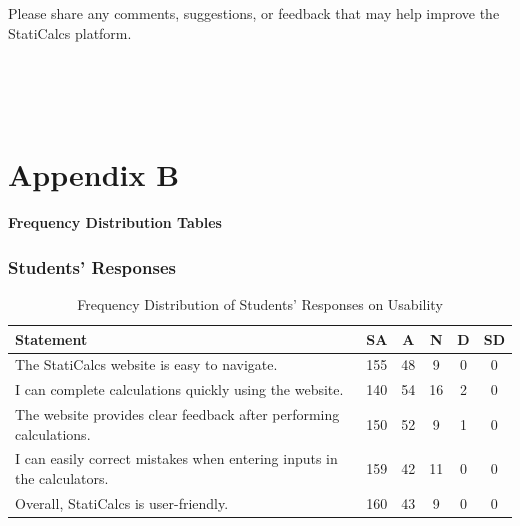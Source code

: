 Please share any comments, suggestions, or feedback that may help improve the StatiCalcs platform.

\vspace{0.5cm}

\noindent
\underline{\hspace{15cm}}\\[0.5cm]
\underline{\hspace{15cm}}\\[0.5cm]
\underline{\hspace{15cm}}\\[0.5cm]
\underline{\hspace{15cm}}

\chapter{Appendix B}\label{appendix:B}
\thispagestyle{backmatter}


\begin{center}
\textbf{Frequency Distribution Tables}
\end{center}

\vspace{0.5cm}

\subsection*{Students' Responses}

\begin{table}[H]
\centering
\caption{Frequency Distribution of Students’ Responses on Usability}
\renewcommand{\arraystretch}{1.3}
\begin{tabular}{p{8cm}ccccc}
\hline
\textbf{Statement} & \textbf{SA} & \textbf{A} & \textbf{N} & \textbf{D} & \textbf{SD}\\
\hline
The StatiCalcs website is easy to navigate. & 155 & 48 & 9 & 0 & 0\\
I can complete calculations quickly using the website. & 140 & 54 & 16 & 2 & 0\\
The website provides clear feedback after performing calculations. & 150 & 52 & 9 & 1 & 0\\
I can easily correct mistakes when entering inputs in the calculators. & 159 & 42 & 11 & 0 & 0\\
Overall, StatiCalcs is user-friendly. & 160 & 43 & 9 & 0 & 0\\
\hline
\end{tabular}
\end{table}

